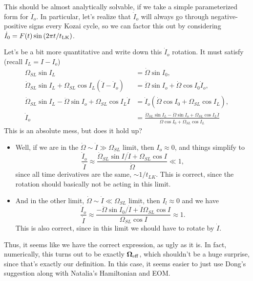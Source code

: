 \documentclass[11pt,
        usenames, %
        dvipsnames %
    ]{article}
\newcommand*{\bm}[1]{\boldsymbol{\mathbf{#1}}}
\newcommand*{\p}[1]{\left(#1\right)}
\begin{document}
This should be almost analytically solvable, if we take a simple parameterized
form for $\dot{I}_o$. In particular, let's realize that $\dot{I}_o$ will always
go through negative-positive signs every Kozai cycle, so we can factor this out
by considering $\dot{I}_0 = F(t) \sin \p{2\pi t / t_{\rm LK}}$.

Let's be a bit more quantitative and write down this $\dot{I}_o$ rotation. It
must satisfy (recall $I_L = I - I_o$)
\begin{align}
    \Omega_{SL}\sin I_L &= \dot{\Omega} \sin I_0,\\
    \dot{\Omega}_{SL}\sin I_L + \Omega_{SL}\cos I_L \p{\dot{I} - \dot{I}_o}
        &= \ddot{\Omega} \sin I_o + \dot{\Omega} \cos I_0 \dot{I}_o,\\
    \dot{\Omega}_{SL}\sin I_L - \ddot{\Omega} \sin I_o +
            \Omega_{SL}\cos I_L \dot{I}
        &= \dot{I}_o\p{\dot{\Omega} \cos I_0 + \Omega_{SL} \cos I_L},\\
    \dot{I}_o &= \frac{\dot{\Omega}_{SL}\sin I_L
            - \ddot{\Omega} \sin I_o
            + \Omega_{SL}\cos I_L \dot{I}}{
        \dot{\Omega} \cos I_0
            + \Omega_{SL} \cos I_L}
\end{align}
This is an absolute mess, but does it hold up?
\begin{itemize}
    \item Well, if we are in the $\dot{\Omega} \sim \dot{I} \gg \Omega_{SL}$
        limit, then $I_o \approx 0$, and things simplify to
        \begin{equation}
            \frac{\dot{I}_o}{\dot{I}} \approx
                \frac{\dot{\Omega}_{SL} \sin I / \dot{I} + \Omega_{SL}\cos I}
                {\dot{\Omega}} \ll 1,
        \end{equation}
        since all time derivatives are the same, $\sim 1/t_{LK}$. This is
        correct, since the rotation should basically not be acting in this
        limit.

    \item And in the other limit, $\dot{\Omega} \sim \dot{I} \ll
        \Omega_{SL}$ limit, then $I_l \approx 0$ and we have
        \begin{equation}
            \frac{\dot{I}_o}{\dot{I}} \approx
                \frac{-\ddot{\Omega}\sin I_0 / \dot{I}
                    + \dot{I} \Omega_{SL} \cos I}{
                        \Omega_{SL} \cos I}
                \approx 1.
        \end{equation}
        This is also correct, since in this limit we should have to rotate by
        $\dot{I}$.
\end{itemize}
Thus, it seems like we have the correct expression, as ugly as it is. In fact,
numerically, this turns out to be exactly $\bm{\Omega}_{\rm eff}$, which
shouldn't be a huge surprise, since that's exactly our definition. In this case,
it seems easier to just use Dong's suggestion along with Natalia's Hamiltonian
and EOM\@.
\end{document}
